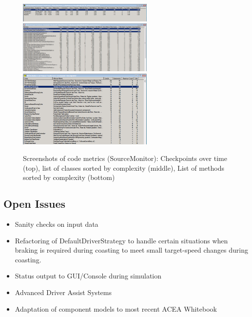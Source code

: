 \begin{figure}
	\centering
	\includegraphics[width=0.6\textwidth]{img/Vecto3_0_1-Checkpoints.png}\\[1cm]

	\includegraphics[width=0.6\textwidth]{img/Vecto3_0_1-ClassComplexity.png}\\[1cm]

	\includegraphics[width=0.6\textwidth]{img/Vecto3_0_1-MethodComplexity.png}

	\caption{Screenshots of code metrics (SourceMonitor): Checkpoints over time (top), list of classes sorted by complexity (middle), List of methods sorted by complexity (bottom)}
	\label{fig:Vecto301_Komplexity}
\end{figure}




\subsection{Open Issues} %
\label{sub:open_issues}

\begin{itemize}
	\item Sanity checks on input data
	\item Refactoring of DefaultDriverStrategy to handle certain situations when braking is required during coasting to meet small target-speed changes during coasting.
	\item Status output to GUI/Console during simulation
	\item Advanced Driver Assist Systems
	\item Adaptation of component models to most recent ACEA Whitebook
\end{itemize}

